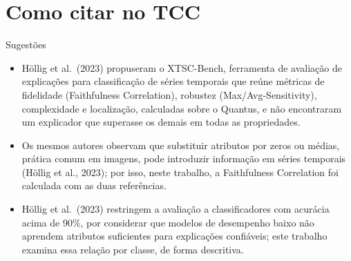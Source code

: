 \documentclass[11pt,a4paper]{article}
\begin{document}
\section{Como citar no TCC}
\begin{infobox}[ok]{Sugestões}
\begin{itemize}
\item Höllig et al.\ (2023) propuseram o XTSC-Bench, ferramenta de avaliação de explicações para classificação de séries temporais que reúne métricas de fidelidade (Faithfulness Correlation), robustez (Max/Avg-Sensitivity), complexidade e localização, calculadas sobre o Quantus, e não encontraram um explicador que superasse os demais em todas as propriedades.
\item Os mesmos autores observam que substituir atributos por zeros ou médias, prática comum em imagens, pode introduzir informação em séries temporais (Höllig et al., 2023); por isso, neste trabalho, a Faithfulness Correlation foi calculada com as duas referências.
\item Höllig et al.\ (2023) restringem a avaliação a classificadores com acurácia acima de 90\%, por considerar que modelos de desempenho baixo não aprendem atributos suficientes para explicações confiáveis; este trabalho examina essa relação por classe, de forma descritiva.
\end{itemize}
\end{infobox}
\end{document}
